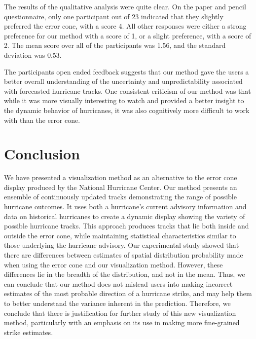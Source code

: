 \documentclass[journal]{vgtc}                %
\begin{document}
The results of the qualitative analysis were quite clear.  On the paper and pencil questionnaire, only one participant out of 23 indicated that they slightly preferred the error cone, with a score 4.  All other responses were either a strong preference for our method with a score of 1, or a slight preference, with a score of 2.  The mean score over all of the participants was 1.56, and the standard deviation was 0.53.

The participants open ended feedback suggests that our method gave the users a better overall understanding of the uncertainty and unpredictability associated with forecasted hurricane tracks.  One consistent criticism of our method was that while it was more visually interesting to watch and provided a better insight to the dynamic behavior of hurricanes, it was also cognitively more difficult to work with than the error cone.

\section{Conclusion}

We have presented a visualization method as an alternative to the error cone display produced by the National Hurricane Center. 
Our method presents an ensemble of continuously updated tracks demonstrating the range of possible hurricane outcomes. It
uses both a hurricane's current advisory information and data on historical hurricanes to create a dynamic display showing the variety of possible hurricane tracks.  This approach produces tracks that lie both inside and outside the error cone, while maintaining statistical characteristics similar to those underlying the hurricane advisory. Our experimental study showed that there are differences between estimates of spatial distribution probability made when using
the error cone and our visualization method. However, these differences lie in the breadth of the distribution, and not in the mean. Thus, we can conclude
that our method does not mislead users into making incorrect estimates of the most probable direction of a hurricane strike, and may help them to better
understand the variance inherent in the prediction. Therefore, we conclude that there is justification for further study of this new visualization method, 
particularly with an emphasis on its use in making more fine-grained strike estimates.
\end{document}
